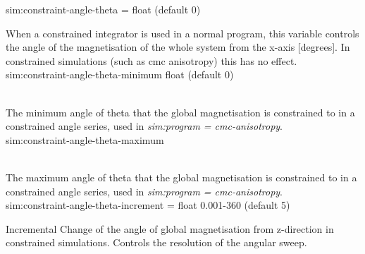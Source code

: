 {\zicf sim:constraint-angle-theta = float (default 0)}
    When a constrained integrator is used in a normal program, this variable controls the angle of the magnetisation of the whole system from the x-axis [degrees]. In constrained simulations (such as cmc anisotropy) this has no effect.\\

{\zicf  sim:constraint-angle-theta-minimum float (default 0)}\\
    The minimum angle of theta that the global magnetisation is constrained to in a constrained angle series, used in \textit{sim:program = cmc-anisotropy}.\\
{\zicf  sim:constraint-angle-theta-maximum}\\
    The maximum angle of theta that the global magnetisation is constrained to in a constrained angle series, used in \textit{sim:program = cmc-anisotropy}.\\
{\zicf  sim:constraint-angle-theta-increment = float 0.001-360 (default 5)}
    Incremental Change of the angle of global magnetisation from z-direction in constrained simulations. Controls the resolution of the angular sweep.\\

